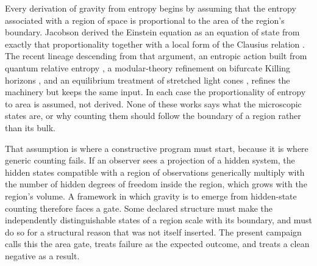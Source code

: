 \documentclass[aps,pre,reprint,nofootinbib]{revtex4-2}
\begin{document}
Every derivation of gravity from entropy begins by assuming that the
entropy associated with a region of space is proportional to the area of
the region's boundary.  Jacobson derived the Einstein equation as an
equation of state from exactly that proportionality together with a local
form of the Clausius relation \cite{Jacobson1995}.  The recent lineage
descending from that argument, an entropic action built from quantum
relative entropy \cite{Bianconi2025}, a modular-theory refinement on
bifurcate Killing horizons \cite{DorauMuch2026}, and an equilibrium
treatment of stretched light cones \cite{AlonsoSerrano2025}, refines the
machinery but keeps the same input.  In each case the proportionality of
entropy to area is assumed, not derived.  None of these works says what
the microscopic states are, or why counting them should follow the
boundary of a region rather than its bulk.

That assumption is where a constructive program must start, because it is
where generic counting fails.  If an observer sees a projection of a
hidden system, the hidden states compatible with a region of observations
generically multiply with the number of hidden degrees of freedom inside
the region, which grows with the region's volume.  A framework in which
gravity is to emerge from hidden-state counting therefore faces a gate.
Some declared structure must make the independently distinguishable
states of a region scale with its boundary, and must do so for a
structural reason that was not itself inserted.  The present campaign
calls this the area gate, treats failure as the expected outcome, and
treats a clean negative as a result.
\end{document}
